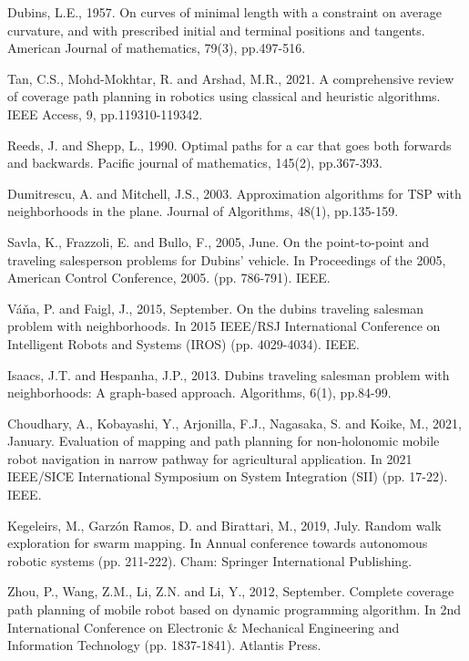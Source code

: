 \begin{thebibliography}{9}

\setlength{\itemsep}{1pt}

Dubins, L.E., 1957. On curves of minimal length with a constraint on average curvature, and with prescribed initial and terminal positions and tangents. American Journal of mathematics, 79(3), pp.497-516.

Tan, C.S., Mohd-Mokhtar, R. and Arshad, M.R., 2021. A comprehensive review of coverage path planning in robotics using classical and heuristic algorithms. IEEE Access, 9, pp.119310-119342.

Reeds, J. and Shepp, L., 1990. Optimal paths for a car that goes both forwards and backwards. Pacific journal of mathematics, 145(2), pp.367-393.

Dumitrescu, A. and Mitchell, J.S., 2003. Approximation algorithms for TSP with neighborhoods in the plane. Journal of Algorithms, 48(1), pp.135-159.

Savla, K., Frazzoli, E. and Bullo, F., 2005, June. On the point-to-point and traveling salesperson problems for Dubins' vehicle. In Proceedings of the 2005, American Control Conference, 2005. (pp. 786-791). IEEE.

Váňa, P. and Faigl, J., 2015, September. On the dubins traveling salesman problem with neighborhoods. In 2015 IEEE/RSJ International Conference on Intelligent Robots and Systems (IROS) (pp. 4029-4034). IEEE.

Isaacs, J.T. and Hespanha, J.P., 2013. Dubins traveling salesman problem with neighborhoods: A graph-based approach. Algorithms, 6(1), pp.84-99.

Choudhary, A., Kobayashi, Y., Arjonilla, F.J., Nagasaka, S. and Koike, M., 2021, January. Evaluation of mapping and path planning for non-holonomic mobile robot navigation in narrow pathway for agricultural application. In 2021 IEEE/SICE International Symposium on System Integration (SII) (pp. 17-22). IEEE.

Kegeleirs, M., Garzón Ramos, D. and Birattari, M., 2019, July. Random walk exploration for swarm mapping. In Annual conference towards autonomous robotic systems (pp. 211-222). Cham: Springer International Publishing.

Zhou, P., Wang, Z.M., Li, Z.N. and Li, Y., 2012, September. Complete coverage path planning of mobile robot based on dynamic programming algorithm. In 2nd International Conference on Electronic \& Mechanical Engineering and Information Technology (pp. 1837-1841). Atlantis Press.


\end{thebibliography}
